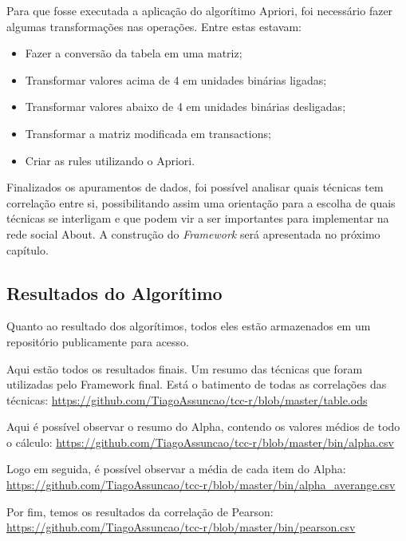 

Para que fosse executada a aplicação do algorítimo Apriori, foi necessário fazer
algumas transformações nas operações. Entre estas estavam:

\begin{itemize}
    \item Fazer a conversão da tabela em uma matriz;
    \item Transformar valores acima de 4 em unidades binárias ligadas;
    \item Transformar valores abaixo de 4 em unidades binárias desligadas;
    \item Transformar a matriz modificada em transactions;
    \item Criar as rules utilizando o Apriori.
\end{itemize}



Finalizados os apuramentos de dados, foi possível analisar quais técnicas tem correlação
entre si, possibilitando assim uma orientação para a escolha de quais técnicas se interligam
e que podem vir a ser importantes para implementar na rede social About. A construção
do \textit{Framework} será apresentada no próximo capítulo.

\subsection{Resultados do Algorítimo}
Quanto ao resultado dos algorítimos, todos eles estão armazenados em um repositório publicamente
para acesso. 

Aqui estão todos os resultados finais. Um resumo das técnicas que foram utilizadas pelo Framework final.
Está o batimento de todas as correlações das técnicas: 
\url{https://github.com/TiagoAssuncao/tcc-r/blob/master/table.ods}

Aqui é possível observar o resumo do Alpha, contendo os valores médios de todo o cálculo:
\url{https://github.com/TiagoAssuncao/tcc-r/blob/master/bin/alpha.csv}

Logo em seguida, é possível observar a média de cada item do Alpha:
\url{https://github.com/TiagoAssuncao/tcc-r/blob/master/bin/alpha_averange.csv}

Por fim, temos os resultados da correlação de Pearson:
\url{https://github.com/TiagoAssuncao/tcc-r/blob/master/bin/pearson.csv}

